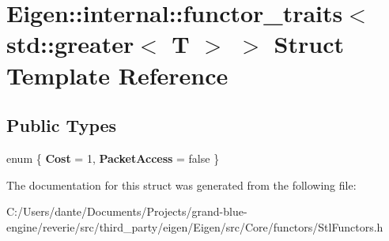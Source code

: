 \hypertarget{struct_eigen_1_1internal_1_1functor__traits_3_01std_1_1greater_3_01_t_01_4_01_4}{}\section{Eigen\+::internal\+::functor\+\_\+traits$<$ std\+::greater$<$ T $>$ $>$ Struct Template Reference}
\label{struct_eigen_1_1internal_1_1functor__traits_3_01std_1_1greater_3_01_t_01_4_01_4}
\subsection*{Public Types}
\begin{DoxyCompactItemize}
\item 
\mbox{\label{struct_eigen_1_1internal_1_1functor__traits_3_01std_1_1greater_3_01_t_01_4_01_4_ae0b205686904936a60f4c819fba4de9e}} 
enum \{ {\bfseries Cost} = 1, 
{\bfseries Packet\+Access} = false
 \}
\end{DoxyCompactItemize}


The documentation for this struct was generated from the following file\+:\begin{DoxyCompactItemize}
\item 
C\+:/\+Users/dante/\+Documents/\+Projects/grand-\/blue-\/engine/reverie/src/third\+\_\+party/eigen/\+Eigen/src/\+Core/functors/Stl\+Functors.\+h\end{DoxyCompactItemize}
